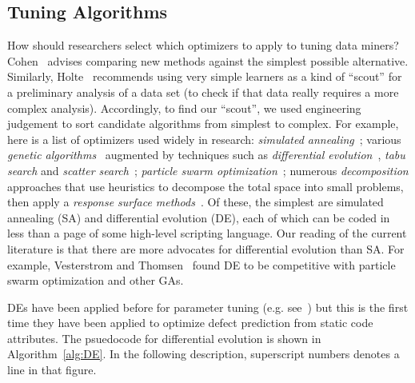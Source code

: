 \documentclass{sig-alternative}
\begin{document}
\subsection{Tuning Algorithms}
  
   
How should researchers select which optimizers to apply to tuning data miners?
Cohen~\cite{cohen95} advises comparing new 
 methods against the simplest possible alternative. 
Similarly, Holte~\cite{holte93} recommends using very simple  learners
 as a
kind of ``scout'' for a  preliminary analysis of a data
set (to check if that data really requires a more
complex analysis).
Accordingly,
to find our ``scout'',  we used engineering judgement to sort  candidate algorithms from simplest to  complex. For
example, here is a list of optimizers used widely in research:
{\em 
simulated annealing}~\cite{fea02a,me07f};
 various {\em genetic algorithms}~\cite{goldberg79} augmented by
techniques such as {\em differential evolution}~\cite{storn1997differential}, 
{\em tabu search} and {\em scatter search}~\cite{Glover1986563,Beausoleil2006426,Molina05sspmo:a,4455350};
{\em particle swarm optimization}~\cite{pan08}; 
numerous {\em decomposition} approaches that use
    heuristics to decompose the total space into   small problems,   then apply a
    {\em response surface methods}~\cite{krall15,Zuluaga:13}.
Of these,  the simplest are simulated annealing (SA)  and 
differential evolution (DE), each of which can be coded in less than a page of some high-level scripting language. Our reading of the current literature is that there are more  advocates for
differential evolution than
  SA. For example,  Vesterstrom and Thomsen~\cite{Vesterstrom04} found DE to be competitive with 
   particle swarm optimization and other GAs. 
   
DEs have been applied before for   parameter tuning (e.g. see~\cite{omran2005differential, chiha2012tuning}) but this is the first time they have been applied to
optimize defect prediction from static code attributes.  
The psuedocode for differential evolution is shown in Algorithm~\ref{alg:DE}.
In the following description, 
    superscript numbers denotes a line in that figure.

 
\end{document}
